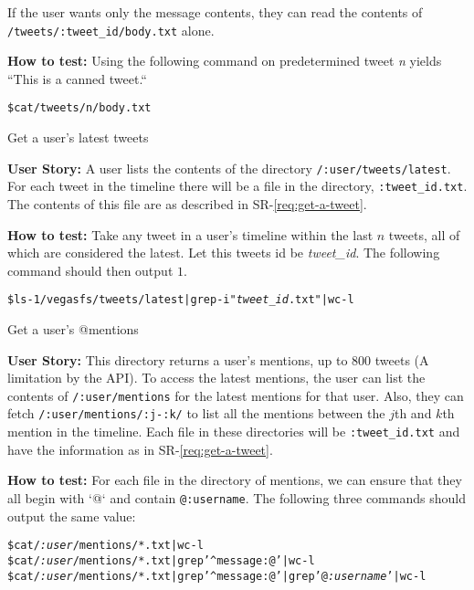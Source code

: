 \begin{Requirements}
If the user wants only the message contents, they can read the contents of
\texttt{/tweets/:tweet\_id/body.txt} alone.

\textbf{How to test:} Using the following command on predetermined tweet
\textit{n} yields ``This is a canned tweet.``

\begin{alltt}
    \$ cat /tweets/n/body.txt
\end{alltt}

\item Get a user's latest tweets\label{req:get-latest}

\textbf{User Story:} A user lists the contents of the directory
\texttt{/:user/tweets/latest}. For each tweet in the timeline there will be a
file in the directory, \texttt{:tweet\_id.txt}. The contents of this file are as
described in SR-\ref{req:get-a-tweet}.

\textbf{How to test:} Take any tweet in a user's timeline within the last $n$
tweets, all of which are considered the latest. Let this tweets id be
\textit{tweet\_id}. The following command should then output $1$.

\begin{alltt}
    \$ ls -1 /vegasfs/tweets/latest | grep -i "\textit{tweet\_id}.txt" | wc -l
\end{alltt}

\item Get a user's @mentions

\textbf{User Story:} This directory returns a user's mentions, up to 800 tweets (A
limitation by the API). To access the latest mentions, the user can list the
contents of \texttt{/:user/mentions} for the latest mentions for that user.
Also, they can fetch \texttt{/:user/mentions/:j-:k/} to list all the mentions
between the $j$th and $k$th mention in the timeline. Each file in these
directories will be \texttt{:tweet\_id.txt} and have the information as in
SR-\ref{req:get-a-tweet}.

\textbf{How to test:} For each file in the directory of mentions, we can ensure
that they all begin with `@` and contain \texttt{@:username}. The following
three commands should output the same value:

\begin{alltt}
    \$ cat /\textit{:user}/mentions/*.txt | wc -l
    \$ cat /\textit{:user}/mentions/*.txt | grep '^message:@' | wc -l
    \$ cat /\textit{:user}/mentions/*.txt | grep '^message:@' | grep '@\textit{:username}' | wc -l
\end{alltt}


\end{Requirements}
